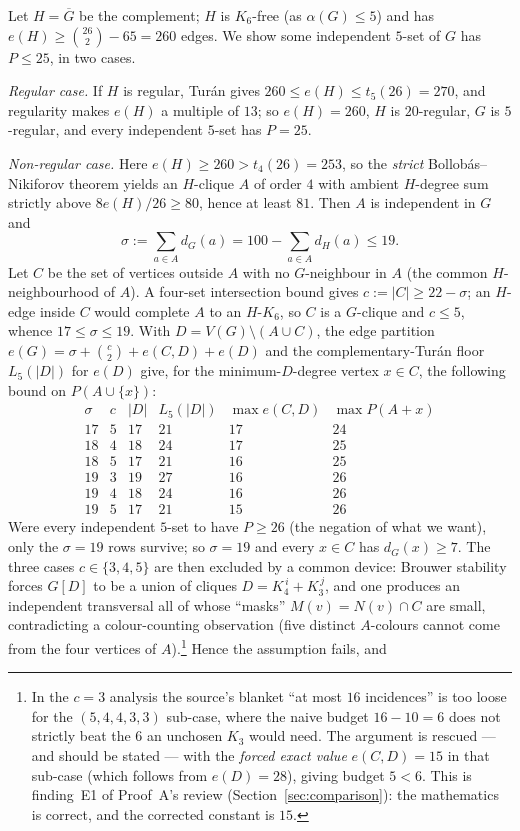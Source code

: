 \documentclass[11pt,reqno]{amsart}
\theoremstyle{definition}
\theoremstyle{remark}
\newcommand{\abs}[1]{\left|#1\right|}
\begin{document}
Let $H=\overline G$ be the complement; $H$ is $K_6$-free (as $\alpha(G)\le 5$) and has
$e(H)\ge\binom{26}{2}-65=260$ edges. We show some independent $5$-set of $G$ has
$P\le 25$, in two cases.

\emph{Regular case.} If $H$ is regular, Tur\'an gives $260\le e(H)\le t_5(26)=270$, and
regularity makes $e(H)$ a multiple of $13$; so $e(H)=260$, $H$ is $20$-regular, $G$ is
$5$-regular, and every independent $5$-set has $P=25$.

\emph{Non-regular case.} Here $e(H)\ge 260>t_4(26)=253$, so the \emph{strict}
Bollob\'as--Nikiforov theorem yields an $H$-clique $A$ of order $4$ with ambient
$H$-degree sum strictly above $8e(H)/26\ge 80$, hence at least $81$. Then $A$ is
independent in $G$ and
\[
  \sigma:=\sum_{a\in A}d_G(a)=100-\sum_{a\in A}d_H(a)\le 19.
\]
Let $C$ be the set of vertices outside $A$ with no $G$-neighbour in $A$ (the common
$H$-neighbourhood of $A$). A four-set intersection bound gives $c:=\abs C\ge 22-\sigma$;
an $H$-edge inside $C$ would complete $A$ to an $H$-$K_6$, so $C$ is a $G$-clique and
$c\le 5$, whence $17\le\sigma\le 19$. With $D=V(G)\setminus(A\cup C)$, the edge partition
$e(G)=\sigma+\binom c2+e(C,D)+e(D)$ and the complementary-Tur\'an floor $L_5(\abs D)$ for
$e(D)$ give, for the minimum-$D$-degree vertex $x\in C$, the following bound on
$P(A\cup\{x\})$:
\[
  \begin{array}{c|c|c|c|c|c}
    \sigma & c & \abs D & L_5(\abs D) & \max e(C,D) & \max P(A{+}x)\\\hline
    17 & 5 & 17 & 21 & 17 & 24\\
    18 & 4 & 18 & 24 & 17 & 25\\
    18 & 5 & 17 & 21 & 16 & 25\\
    19 & 3 & 19 & 27 & 16 & 26\\
    19 & 4 & 18 & 24 & 16 & 26\\
    19 & 5 & 17 & 21 & 15 & 26
  \end{array}
\]
Were every independent $5$-set to have $P\ge 26$ (the negation of what we want), only the
$\sigma=19$ rows survive; so $\sigma=19$ and every $x\in C$ has $d_G(x)\ge 7$. The three
cases $c\in\{3,4,5\}$ are then excluded by a common device: Brouwer stability forces
$G[D]$ to be a union of cliques $D=K_4^{\,i}+K_3^{\,j}$, and one produces an independent
transversal all of whose ``masks'' $M(v)=N(v)\cap C$ are small, contradicting a
colour-counting observation (five distinct $A$-colours cannot come from the four vertices
of $A$).\footnote{In the $c=3$ analysis the source's blanket ``at most $16$ incidences''
is too loose for the $(5,4,4,3,3)$ sub-case, where the naive budget $16-10=6$ does not
strictly beat the $6$ an unchosen $K_3$ would need. The argument is rescued --- and should
be stated --- with the \emph{forced exact value} $e(C,D)=15$ in that sub-case (which
follows from $e(D)=28$), giving budget $5<6$. This is finding~E1 of Proof~A's review
(Section~\ref{sec:comparison}): the mathematics is correct, and the corrected constant is
$15$.} Hence the assumption fails, and
\end{document}
